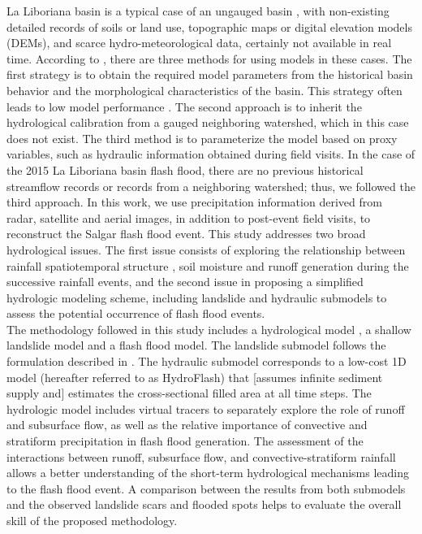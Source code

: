 \documentclass[hess, manuscript]{copernicus}
\begin{document}
La Liboriana basin is a typical case of an ungauged basin  \citep{Sivapalan2013, Seibert2009, Beven2007, Bonell2006, Yamanaka2017}, with non-existing detailed records of soils or land use, topographic maps or digital elevation models (DEMs), and scarce hydro-meteorological data, certainly not available in real time. According to \citet{blschl2012}, there are three methods for using models in these cases. The first strategy is to obtain the required model parameters from the historical basin behavior and the morphological characteristics of the basin. This strategy often leads to low model performance \citep{Duan2006}. The second approach is to inherit the hydrological calibration from a gauged neighboring watershed, which in this case does not exist. The third method is to parameterize the model based on proxy variables, such as hydraulic information obtained during field visits. In the case of the 2015 La Liboriana basin flash flood, there are no previous historical streamflow records or records from a neighboring watershed; thus, we followed the third approach. In this work, we use precipitation information derived from radar, satellite and aerial images, in addition to post-event field visits, to reconstruct the Salgar flash flood event. This study addresses two broad hydrological issues. The first issue consists of exploring the relationship between rainfall spatiotemporal structure \citep{Llasat2016,Fragoso2012}, soil moisture and runoff generation \citep{Penna2011,Tramblay2012b,Garambois2013} during the successive rainfall events, and the second issue in proposing a simplified hydrologic modeling scheme, including landslide and hydraulic submodels to assess the potential occurrence of flash flood events.\\

The methodology followed in this study includes a hydrological model \citep{Velez2001, Frances2007b}, a shallow landslide model and a flash flood model. The landslide submodel follows the formulation described in \citep{Aristizabal2016}. The hydraulic submodel corresponds to a low-cost 1D model (hereafter referred to as HydroFlash) that [assumes infinite sediment supply and] estimates the cross-sectional filled area at all time steps. The hydrologic model includes virtual tracers to separately explore the role of runoff and subsurface flow, as well as the relative importance of convective and stratiform precipitation in flash flood generation. The assessment of the interactions between runoff, subsurface flow, and convective-stratiform rainfall allows a better understanding of the short-term hydrological mechanisms leading to the flash flood event.  A comparison between the results from both submodels and the observed landslide scars and flooded spots helps to evaluate the overall skill of the proposed methodology. \\
\end{document}
